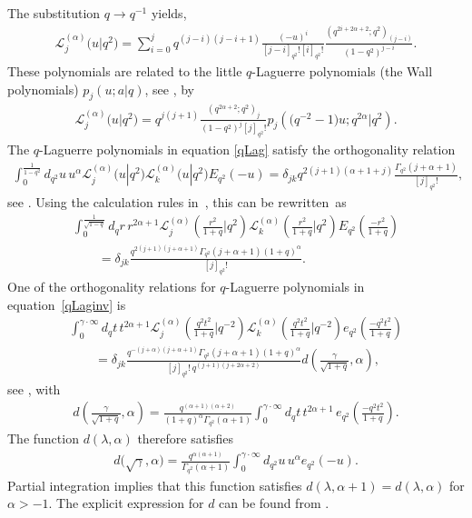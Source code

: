\documentclass[pdftex]{sigma}
\newcommand{\cL}{\mathcal{L}}
\numberwithin{equation}{section}
\begin{document}
The substitution $q\to q^{-1}$ yields,
\begin{gather}
\label{qLag}
\cL^{(\alpha)}_j\big(u|q^2\big) = \sum_{i=0}^jq^{(j-i)(j-i+1)}\frac{(-u)^i}{[j-i]_{q^2}![i]_{q^2}!}\frac{(q^{2i+2\alpha+2};q^2)_{(j-i)}}{(1-q^2)^{j-i}}.
\end{gather}
These polynomials are related to the little $q$-Laguerre polynomials (the Wall polynomials) $p_j(u;a|q)$, see \cite[Section~3.20]{Koekoek}, by
\begin{gather*}
\cL^{(\alpha)}_j\big(u|q^2\big) = q^{j(j+1)}\frac{(q^{2\alpha+2};q^2)_j}{(1-q^2)^j[j]_{q^2}!}p_j\left(\big(q^{-2}-1\big)u;q^{2\alpha}|q^2\right).
\end{gather*}
The $q$-Laguerre polynomials in equation \eqref{qLag} satisfy the orthogonality relation
\begin{gather*}
\int_0^{\frac{1}{1-q^2}}d_{q^2}u\,u^\alpha\cL_j^{(\alpha)}\big(u|q^2\big)\cL_k^{(\alpha)}\big(u|q^2\big)E_{q^2}(-u)=
\delta_{jk}q^{2(j+1)(\alpha+1+j)}\frac{\Gamma_{q^2}(j+\alpha+1)}{[j]_{q^2}!},
\end{gather*}
see \cite[equation (3.20.2)]{Koekoek}. Using the calculation rules in~\cite[Lemma 10]{MR2595267}, this can be rewritten~as
\begin{gather}
 \int_0^{\frac{1}{\sqrt{1-q}}}d_qr\, r^{2\alpha+1}\cL_j^{(\alpha)}\left(\frac{r^2}{1+q}|q^2\right)\cL_k^{(\alpha)}\left(\frac{r^2}{1+q}|q^2\right) E_{q^2}\left(\frac{-r^2}{1+q}\right)\nonumber\\
\qquad{} =\delta_{jk}\frac{q^{2(j+1)(j+\alpha+1)}\Gamma_{q^2}(j+\alpha+1)(1+q)^{\alpha}}{[j]_{q^2}!}.\label{orthLag1}
\end{gather}
One of the orthogonality relations for $q$-Laguerre polynomials in equation~\eqref{qLaginv} is
\begin{gather}
 \int_0^{\gamma\cdot\infty}d_qt\, t^{2\alpha+1}\cL_j^{(\alpha)}\left(\frac{q^2t^2}{1+q}|q^{-2}\right)\cL_k^{(\alpha)}\left(\frac{q^2t^2}{1+q}|q^{-2}\right)
 e_{q^2}\left(\frac{-q^2t^2}{1+q}\right)\nonumber\\
\qquad{} =\delta_{jk}\frac{q^{-(j+\alpha)(j+\alpha+1)}\Gamma_{q^2}(j+\alpha+1)
(1+q)^{\alpha}}{[j]_{q^2}!\,q^{(j+1)(j+2\alpha+2)}}d\left(\frac{\gamma}{\sqrt{1+q}},\alpha\right),\label{orthLag2}
\end{gather}
see \cite[equation~(3.21.3)]{Koekoek}, with
\begin{gather*}
d\left(\frac{\gamma}{\sqrt{1+q}},\alpha\right) = \frac{q^{(\alpha+1)(\alpha+2)}}{(1+q)^\alpha\Gamma_{q^2}(\alpha+1)}\int_0^{\gamma\cdot\infty}d_qt\, t^{2\alpha+1}\,e_{q^2}\left(\frac{-q^2t^2}{1+q}\right).
\end{gather*}
The function $d(\lambda,\alpha)$ therefore satisf\/ies
\begin{gather*}
d\big(\sqrt{\gamma},\alpha\big) = \frac{q^{\alpha(\alpha+1)}}{\Gamma_{q^2}(\alpha+1)}\int_0^{\gamma\cdot\infty}d_{q^2}u\,u^\alpha e_{q^2}(-u).
\end{gather*}
Partial integration implies that this function satisf\/ies $d(\lambda,\alpha+1)=d(\lambda,\alpha)$ for $\alpha>-1$. The explicit expression for $d$ can be found from \cite[equation~(3.21.3)]{Koekoek}.
\end{document}
